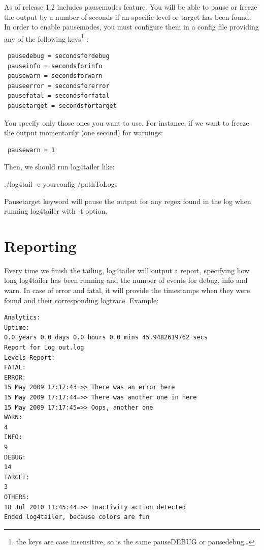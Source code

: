 \label{sec:PauseModes}As of release 1.2 \logftailer{} includes pausemodes feature. You will be able 
to pause or freeze the output by a number of seconds if an specific level or target 
has been found. In order to enable pausemodes, you must configure them in a config file 
providing any of the following keys\footnote{the keys are case insensitive, so is the same pauseDEBUG or pausedebug\ldots} :

\begin{config}
\begin{verbatim}
 pausedebug = secondsfordebug
 pauseinfo = secondsforinfo
 pausewarn = secondsforwarn
 pauseerror = secondsforerror
 pausefatal = secondsforfatal
 pausetarget = secondsfortarget
\end{verbatim}
\end{config}

\noindent
You specify only those ones you want to use.
For instance, if we want to freeze the output momentarily (one second) for warnings:

\begin{config}
\begin{verbatim}
 pausewarn = 1
\end{verbatim}
\end{config}

\noindent
Then, we should run log4tailer like:
\begin{cmd}
./log4tail -c yourconfig /pathToLogs
\end{cmd}
Pausetarget keyword will pause the output for any regex found in the log when running log4tailer with -t option.


\section{Reporting}
Every time we finish the tailing, log4tailer will output a report, specifying how long 
log4tailer has been running and the number of events for debug, info and warn. In case of 
error and fatal, it will provide the timestamps when they were found and their corresponding logtrace.
Example:
\begin{verbatim}
Analytics: 
Uptime: 
0.0 years 0.0 days 0.0 hours 0.0 mins 45.9482619762 secs 
Report for Log out.log
Levels Report: 
FATAL:
ERROR:
15 May 2009 17:17:43=>> There was an error here
15 May 2009 17:17:44=>> There was another one in here
15 May 2009 17:17:45=>> Oops, another one
WARN:
4
INFO:
9
DEBUG:
14
TARGET:
3
OTHERS:
18 Jul 2010 11:45:44=>> Inactivity action detected
Ended log4tailer, because colors are fun
\end{verbatim}

